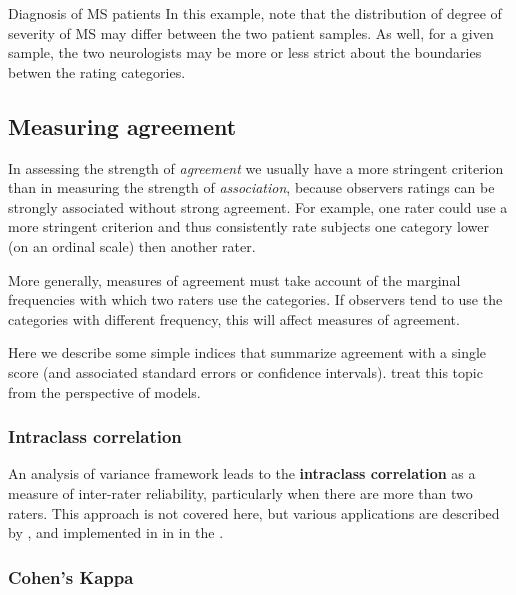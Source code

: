 \documentclass[11pt]{book}\usepackage[]{graphicx}\usepackage[]{color}
\begin{document}
\begin{Example}[MS1]{Diagnosis of MS patients}
In this example, note that the distribution of degree of severity of
MS may differ between the two patient samples.  As well, for a
given sample, the two neurologists may be more or less strict about
the boundaries betwen the rating categories.

%
\end{Example}

\subsection{Measuring agreement}\label{sec:agreemeas}
In assessing the strength of \emph{agreement} we usually have a more
stringent criterion than in measuring the strength of \emph{association},
because observers ratings can be strongly associated without strong agreement.
For example, one rater could use a more stringent criterion and thus consistently rate subjects one category lower (on an ordinal scale) then another rater.

More generally, measures of agreement must take account of the
marginal frequencies with which two raters use the categories.
If observers tend to use the categories
with different frequency, this will affect measures of
agreement.

Here we describe some simple indices that summarize agreement with a
single score (and associated standard errors or confidence intervals).
\citet{vonEyeMun:2006} treat this topic from the perspective of
\loglin models.

\subsubsection{Intraclass correlation}
An analysis of variance framework leads to the {\bf intraclass correlation}
as a measure of inter-rater reliability, particularly when there are
more than two raters.
This approach is not covered here, but various applications are described
by \citet{ShroutFleiss:79}, and implemented in \R in 
in the .  

\subsubsection{Cohen's Kappa}
\end{document}
